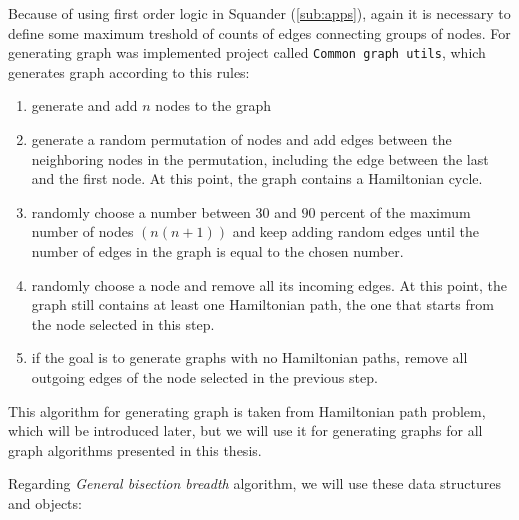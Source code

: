 \documentclass[11pt,twoside,a4paper]{book}
\begin{document}
\begin{center}
\end{center}

Because of using first order logic in Squander (\ref{sub:apps}), again it is
necessary to define some maximum treshold of counts of edges connecting groups of nodes. For generating
graph was implemented project called \verb|Common graph utils|, which generates
graph according to this rules:

\begin{enumerate}
  \item generate and add $n$ nodes to the graph
  \item generate a random permutation of nodes and add edges between the neighboring
nodes in the permutation, including the edge between the last and the first
node. At this point, the graph contains a Hamiltonian cycle.
  \item randomly choose a number between $30$ and $90$ percent of the maximum
  number of nodes $(n(n + 1))$ and keep adding random edges until the number of
  edges in the graph is equal to the chosen number.
  \item randomly choose a node and remove all its incoming edges. At this point, the
graph still contains at least one Hamiltonian path, the one that starts from the
node selected in this step.
\item if the goal is to generate graphs with no Hamiltonian paths, remove all outgoing
edges of the node selected in the previous step.
\end{enumerate}

This algorithm for generating graph is taken from Hamiltonian path problem,
which will be introduced later, but we will use it for generating graphs for all
graph algorithms presented in this thesis.

Regarding \textit{General bisection breadth} algorithm, we will use these data
structures and objects:
\end{document}
